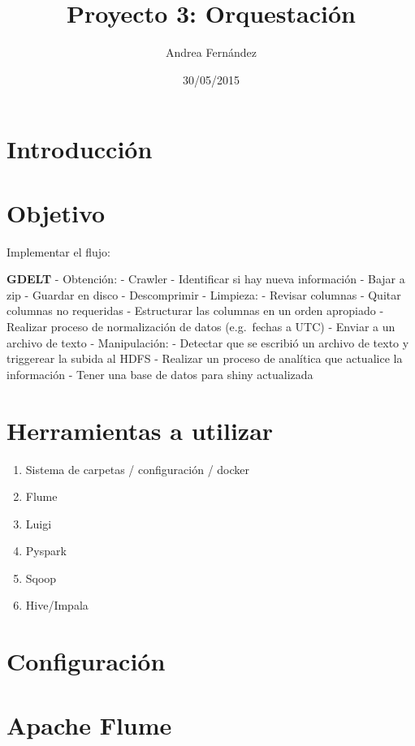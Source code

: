 \documentclass[]{article}
\title{Proyecto 3: Orquestación}
\author{Andrea Fernández}
\date{30/05/2015}
\begin{document}
\maketitle


{
\hypersetup{linkcolor=black}
\setcounter{tocdepth}{3}
\tableofcontents
}
\section{Introducción}\label{introduccion}

\section{Objetivo}\label{objetivo}

Implementar el flujo:

\textbf{GDELT} - Obtención: - Crawler - Identificar si hay nueva
información - Bajar a zip - Guardar en disco - Descomprimir - Limpieza:
- Revisar columnas - Quitar columnas no requeridas - Estructurar las
columnas en un orden apropiado - Realizar proceso de normalización de
datos (e.g.~fechas a UTC) - Enviar a un archivo de texto - Manipulación:
- Detectar que se escribió un archivo de texto y triggerear la subida al
HDFS - Realizar un proceso de analítica que actualice la información -
Tener una base de datos para shiny actualizada

\section{Herramientas a utilizar}\label{herramientas-a-utilizar}

\begin{enumerate}
\def\labelenumi{\arabic{enumi}.}
\itemsep1pt\parskip0pt
\item
  Sistema de carpetas / configuración / docker
\item
  Flume
\item
  Luigi
\item
  Pyspark
\item
  Sqoop
\item
  Hive/Impala
\end{enumerate}

\section{Configuración}\label{configuracion}

\section{Apache Flume}\label{apache-flume}
\end{document}
